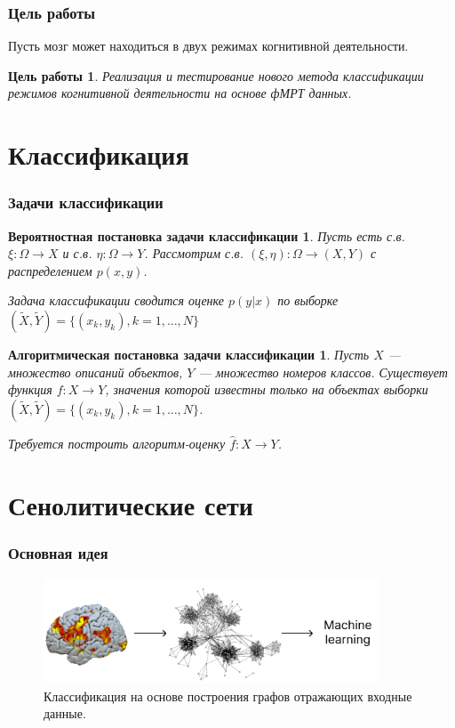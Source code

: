 \documentclass{beamer}
\newtheorem{target_}{Цель работы}
\newtheorem{prob_task}{Вероятностная постановка задачи классификации}
\newtheorem{algo_task}{Алгоритмическая постановка задачи классификации}
\begin{document}
	\begin{frame} 
		\frametitle{Цель работы}
		Пусть мозг может находиться в двух режимах когнитивной деятельности. 
		
		\begin{target_}
			Реализация и тестирование нового метода классификации режимов когнитивной деятельности на основе фМРТ данных.
		\end{target_}			
	\end{frame}

	\section{Классификация}
	\begin{frame} 
		\frametitle{Задачи классификации}
		\begin{prob_task}
			Пусть есть с.в. $\xi: \Omega \rightarrow X$ и с.в. $\eta: \Omega \rightarrow Y$. Рассмотрим с.в. $(\xi, \eta): \Omega \rightarrow (X, Y)$ с распределением $p(x, y)$.
			\vspace{0.5cm}
			
			Задача классификации сводится оценке $p(y|x)$ по выборке $(\widetilde{X}, \widetilde{Y}) = \{(x_{k}, y_{k}), k = 1, \dots, N\}$
		\end{prob_task}
	
		\begin{algo_task}
			Пусть $X$ --- множество описаний объектов, $Y$ --- множество номеров классов. Существует функция $f: X \rightarrow Y$, значения которой известны только на объектах выборки $(\widetilde{X}, \widetilde{Y}) =  \{(x_{k}, y_{k}), k = 1, \dots, N\}$. 
			\vspace{0.5cm}
			
			Требуется построить алгоритм-оценку $\widehat{f}: X \rightarrow Y$.
		\end{algo_task}
	\end{frame}
	
	\section{Сенолитические сети}
	\begin{frame} 
		\frametitle{Основная идея}
		\begin{figure}
			\includegraphics[width=10cm]{../images/fmri_graph_ml_1.pdf}
			\caption{Классификация на основе построения графов отражающих входные данные.} 
			\label{fg:3}
		\end{figure}
	\end{frame}
\end{document}
